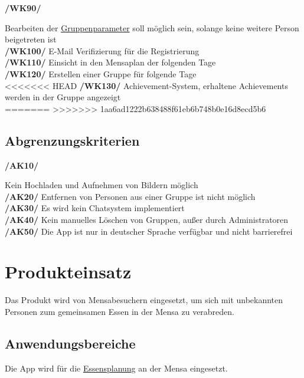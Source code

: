 \documentclass[a4paper]{scrreprt}
\begin{document}
\begin{addmargin}[25pt]{0pt}
\hypertarget{wk90}{\textbf{/WK90/}} Bearbeiten der \hyperlink{label2}{Gruppenparameter} soll möglich sein, solange keine weitere Person beigetreten ist\\
\hypertarget{wk100}{\textbf{/WK100/}} E-Mail Verifizierung für die Registrierung\\
\hypertarget{wk110}{\textbf{/WK110/}} Einsicht in den Mensaplan der folgenden Tage\\
\hypertarget{wk120}{\textbf{/WK120/}} Erstellen einer Gruppe für folgende Tage\\
<<<<<<< HEAD
\hypertarget{wk130}{\textbf{/WK130/}} Achievement-System, erhaltene Achievements werden in der Gruppe angezeigt\\
=======
>>>>>>> 1aa6ad1222b638488f61eb6b748b0e16d8ecd5b6
\end{addmargin}
 
\section{Abgrenzungskriterien}

\begin{addmargin}[25pt]{0pt} 
\hypertarget{ak10}{\textbf{/AK10/}} Kein Hochladen und Aufnehmen von Bildern möglich\\
\hypertarget{ak20}{\textbf{/AK20/}} Entfernen von Personen aus einer Gruppe ist nicht möglich\\
\hypertarget{ak30}{\textbf{/AK30/}} Es wird kein Chatsystem implementiert\\
\hypertarget{ak40}{\textbf{/AK40/}} Kein manuelles Löschen von Gruppen, außer durch Administratoren\\
\hypertarget{ak50}{\textbf{/AK50/}} Die App ist nur in deutscher Sprache verfügbar und nicht barrierefrei\\
\end{addmargin}


\chapter{Produkteinsatz}
Das Produkt wird von Mensabesuchern eingesetzt, um sich mit unbekannten Personen zum gemeinsamen Essen in der Mensa zu verabreden.

 
\section{Anwendungsbereiche}
Die App wird für die \hyperlink{label3}{Essensplanung} an der Mensa eingesetzt.
 
\end{document}
